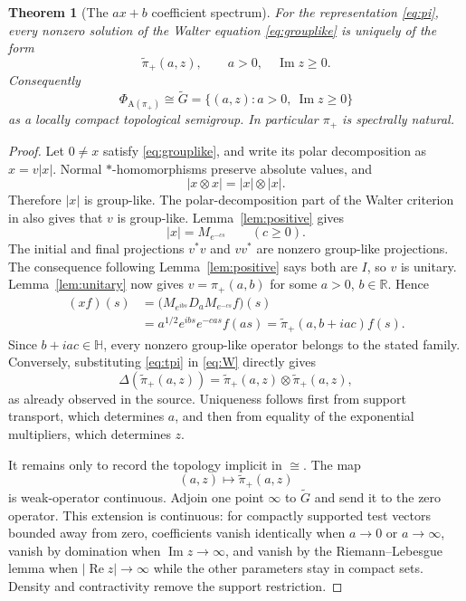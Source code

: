 \documentclass[11pt]{article}
\newtheorem{theorem}{Theorem}
\newcommand{\R}{\mathbb R}
\newcommand{\Hh}{\mathbb H}
\newcommand{\A}{\mathrm A}
\newcommand{\wt}{\widetilde}
\begin{document}
\begin{theorem}[The $ax+b$ coefficient spectrum]\label{thm:main}
For the representation \eqref{eq:pi}, every nonzero solution of the Walter
equation \eqref{eq:grouplike} is uniquely of the form
\[
 \wt\pi_+(a,z),\qquad a>0,\quad \operatorname{Im}z\geq0.
\]
Consequently
\[
 \Phi_{\A(\pi_+)}\cong
 \wt G=\{(a,z):a>0,\ \operatorname{Im}z\geq0\}
\]
as a locally compact topological semigroup.  In particular $\pi_+$ is
spectrally natural.
\end{theorem}

\begin{proof}
Let $0\neq x$ satisfy \eqref{eq:grouplike}, and write its polar decomposition
as $x=v|x|$.  Normal $*$-homomorphisms preserve absolute values, and
\[
 |x\otimes x|=|x|\otimes|x|.
\]
Therefore $|x|$ is group-like.  The polar-decomposition part of the Walter
criterion in \cite[Theorem 3.6]{SpronkStokke} also gives that $v$ is
group-like.  Lemma~\ref{lem:positive} gives
\[
 |x|=M_{e^{-cs}}\qquad(c\geq0).
\]
The initial and final projections $v^*v$ and $vv^*$ are nonzero group-like
projections.  The consequence following Lemma~\ref{lem:positive} says both
are $I$, so $v$ is unitary.  Lemma~\ref{lem:unitary} now gives
$v=\pi_+(a,b)$ for some $a>0$, $b\in\R$.  Hence
\begin{align*}
 (xf)(s)
 &=\bigl(M_{e^{ibs}}D_aM_{e^{-cs}}f\bigr)(s)\\
 &=a^{1/2}e^{ibs}e^{-cas}f(as)
 =\wt\pi_+(a,b+iac)f(s).
\end{align*}
Since $b+iac\in\Hh$, every nonzero group-like operator belongs to the stated
family.  Conversely, substituting \eqref{eq:tpi} in \eqref{eq:W} directly
gives
\[
 \Delta(\wt\pi_+(a,z))
 =\wt\pi_+(a,z)\otimes\wt\pi_+(a,z),
\]
as already observed in the source.  Uniqueness follows first from support
transport, which determines $a$, and then from equality of the exponential
multipliers, which determines $z$.

It remains only to record the topology implicit in $\cong$.  The map
\begin{equation}\label{eq:parammap}
 (a,z)\longmapsto\wt\pi_+(a,z)
\end{equation}
is weak-operator continuous.  Adjoin one point $\infty$ to $\wt G$ and send
it to the zero operator.  This extension is continuous: for compactly
supported test vectors bounded away from zero, coefficients vanish identically
when $a\to0$ or $a\to\infty$, vanish by domination when
$\operatorname{Im}z\to\infty$, and vanish by the Riemann--Lebesgue lemma when
$|\operatorname{Re}z|\to\infty$ while the other parameters stay in compact
sets.  Density and contractivity remove the support restriction.


\end{proof}
\end{document}
